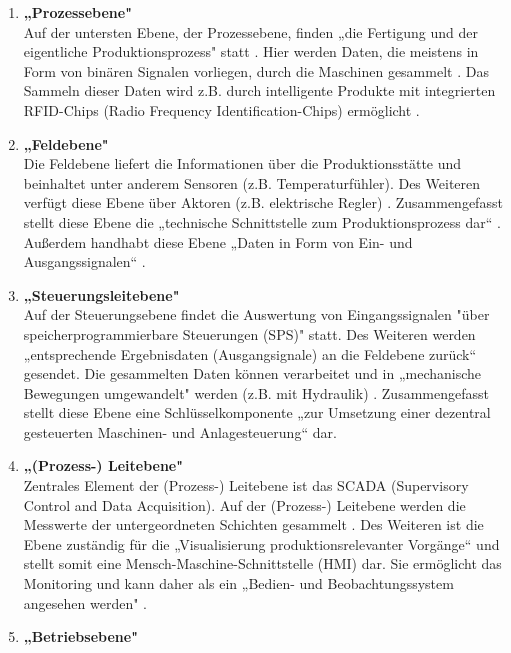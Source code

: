 \begin{enumerate}
	\item \textbf{„Prozessebene"} \cite[S.49]{14} \\
	Auf der untersten Ebene, der Prozessebene, finden „die Fertigung und der eigentliche Produktionsprozess" statt \cite[S.49]{14}. Hier werden Daten, die meistens in Form von binären Signalen vorliegen, durch die Maschinen gesammelt \cite[S.405]{15}. Das Sammeln dieser Daten wird z.B. durch intelligente Produkte mit integrierten RFID-Chips (Radio Frequency Identification-Chips) ermöglicht \cite[S.49]{14}.
	\item \textbf{„Feldebene"} \cite[S.50]{14} \\
	Die Feldebene liefert die Informationen über die Produktionsstätte und beinhaltet unter anderem Sensoren (z.B. Temperaturfühler). Des Weiteren verfügt diese Ebene über Aktoren (z.B. elektrische Regler) \cite[S.50]{14}. Zusammengefasst stellt diese Ebene die „technische Schnittstelle zum Produktionsprozess dar“ \cite[S.405]{15}. Außerdem handhabt diese Ebene „Daten in Form von Ein- und Ausgangssignalen“ \cite[S.50]{14}.
	\item \textbf{„Steuerungsleitebene"} \cite[S.50]{14} \\
	Auf der Steuerungsebene findet die Auswertung von Eingangssignalen "über speicherprogrammierbare Steuerungen (SPS)" \cite[S.50]{14} statt. Des Weiteren werden „entsprechende Ergebnisdaten (Ausgangsignale) an die Feldebene zurück“ \cite[S.50]{14} gesendet. Die gesammelten Daten können verarbeitet und in „mechanische Bewegungen umgewandelt" \cite[S.50]{14} werden (z.B. mit Hydraulik) \cite[S.50]{14}. Zusammengefasst stellt diese Ebene eine Schlüsselkomponente „zur Umsetzung einer dezentral gesteuerten Maschinen- und Anlagesteuerung“ \cite[S.50]{14} dar.
	\item \textbf{„(Prozess-) Leitebene"} \cite[S.50]{14} \\
	Zentrales Element der (Prozess-) Leitebene ist das SCADA (Supervisory Control and Data Acquisition). Auf der (Prozess-) Leitebene werden die Messwerte der untergeordneten Schichten gesammelt \cite[S.405]{15}. Des Weiteren ist die Ebene zuständig für die „Visualisierung produktionsrelevanter Vorgänge“ \cite[S.50]{14} und stellt somit eine Mensch-Maschine-Schnittstelle (HMI) dar. Sie ermöglicht das Monitoring und kann daher als ein „Bedien- und Beobachtungssystem angesehen werden" \cite[S.50]{14}.
	\item \textbf{„Betriebsebene"} \cite[S.50]{14} \\

\end{enumerate}
